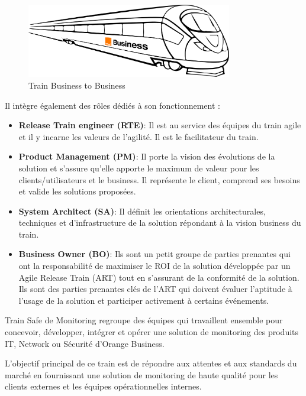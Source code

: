 \begin{figure}[h]
    \centering
    \includegraphics[width=0.8\textwidth]{images/train_BtoB.png}
    \caption{Train Business to Business}
    \label{fig:train_b2b}
\end{figure}

Il intègre également des rôles dédiés à son fonctionnement :

\begin{itemize}
    \item \textbf{Release Train engineer (RTE)}: Il est au service des équipes du train agile et il y incarne les valeurs de l'agilité. Il est le facilitateur du train.
    \item \textbf{Product Management (PM)}: Il porte la vision des évolutions de la solution et s'assure qu'elle apporte le maximum de valeur pour les clients/utilisateurs et le business. Il représente le client, comprend ses besoins et valide les solutions proposées.
    \item \textbf{System Architect (SA)}: Il définit les orientations architecturales, techniques et d'infrastructure de la solution répondant à la vision business du train.
    \item \textbf{Business Owner (BO)}: Ils sont un petit groupe de parties prenantes qui ont la responsabilité de maximiser le ROI de la solution développée par un Agile Release Train (ART) tout en s'assurant de la conformité de la solution. Ils sont des parties prenantes clés de l'ART qui doivent évaluer l'aptitude à l'usage de la solution et participer activement à certains événements.
\end{itemize}

Train Safe de Monitoring regroupe des équipes qui travaillent ensemble pour concevoir, développer, intégrer et opérer une solution de monitoring des produits IT, Network ou Sécurité d'Orange Business. 

\noindent L'objectif principal de ce train est de répondre aux attentes et aux standards du marché en fournissant une solution de monitoring de haute qualité pour les clients externes et les équipes opérationnelles internes.

